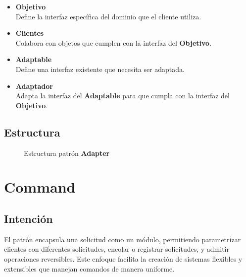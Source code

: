 \begin{itemize}
\item \textbf{Objetivo}\\
Define la interfaz específica del dominio que el cliente utiliza.
\item \textbf{Clientes}\\
Colabora con objetos que cumplen con la interfaz del \textbf{Objetivo}.
\item \textbf{Adaptable}\\
Define una interfaz existente que necesita ser adaptada.
\item \textbf{Adaptador}\\
Adapta la interfaz del \textbf{Adaptable} para que cumpla con la interfaz del \textbf{Objetivo}.
\end{itemize}

\subsection*{Estructura}

\begin{figure}[h]
\caption{Estructura patrón \textbf{Adapter}}
\begin{center}
\end{center}
\end{figure}


\section{Command}
\label{anexoCommand}


\subsection*{Intención}

El patrón encapsula una solicitud como un módulo, permitiendo parametrizar clientes con diferentes solicitudes, encolar o registrar solicitudes, y admitir operaciones reversibles. Este enfoque facilita la creación de sistemas flexibles y extensibles que manejan comandos de manera uniforme.

